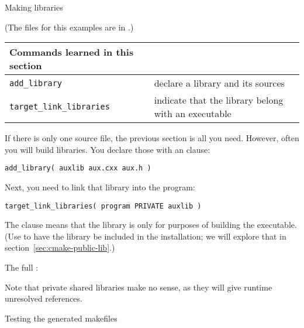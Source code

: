 \newpage
{} {Making libraries}

(The files for this examples are in .)

\begin{tabular}{lp{3in}}
  \toprule
  Commands learned in this section\\
  \midrule
  \lstinline+add_library+&declare a library and its sources\\
  \lstinline+target_link_libraries+&indicate that the library belong with an executable\\
  \bottomrule
\end{tabular}

\begin{floatingfigure}[r]{2.5in}
  \begin{minipage}{2.5in}
  \end{minipage}
\end{floatingfigure}
%
If there is only one source file, the previous section is all you need.
However, often you will build libraries.
You declare those with an  clause:
\begin{lstlisting}
add_library( auxlib aux.cxx aux.h )
\end{lstlisting}
Next, you need to link that library into the program:
\begin{lstlisting}
target_link_libraries( program PRIVATE auxlib )
\end{lstlisting}
The  clause means that the library is only for
purposes of building the executable.
(Use  to have the library be included in the installation;
we will explore that in section~\ref{sec:cmake-public-lib}.)

The full :
%


Note that private shared libraries make no sense, as they will give
runtime unresolved references.

 {Testing the generated makefiles}

